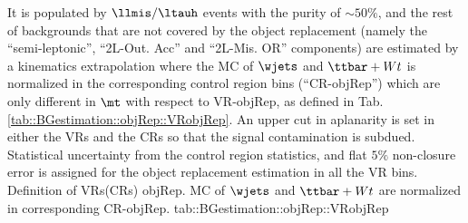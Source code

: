 It is populated by $\llmis / \ltauh$ events with the purity of $\sim 50\%$, and the rest of backgrounds that are not covered by the object replacement (namely the ``semi-leptonic'', ``2L-Out. Acc'' and ``2L-Mis. OR'' components) are estimated by a kinematics extrapolation where the MC of $\wjets$ and $\ttbar+Wt$ is normalized in the corresponding control region bins (``CR-objRep'') which are only different in $\mt$ with respect to VR-objRep, as defined in Tab. \ref{tab::BGestimation::objRep::VRobjRep}. An upper cut in aplanarity is set in either the VRs and the CRs so that the signal contamination is subdued. Statistical uncertainty from the control region statistics, and flat $5\%$ non-closure error is assigned for the object replacement estimation in all the VR bins. \\

{Definition of VRs(CRs) objRep. MC of $\wjets$ and $\ttbar+Wt$ are normalized in corresponding CR-objRep.}
{tab::BGestimation::objRep::VRobjRep}

